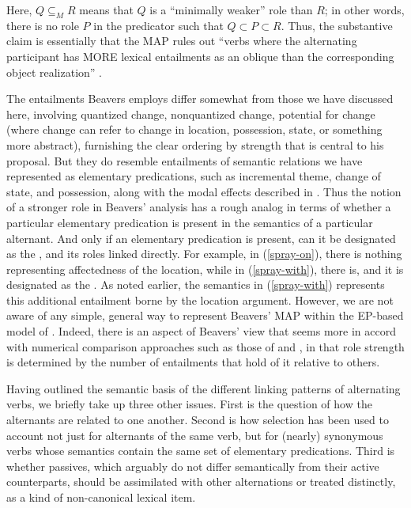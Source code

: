 \documentclass[output=paper]{langsci/langscibook}
\begin{document}
\noindent
Here, $Q\subseteq_{M}R$ means that $Q$ is a ``minimally weaker'' role than $R$; in other words, there is no role $P$ in the predicator such that $Q⊂P⊂R$.
Thus, the substantive claim is essentially that the MAP rules out ``verbs where the alternating participant has \textsc{MORE} lexical entailments as an oblique than the corresponding object realization'' \citep[849]{Beavers2010}.

The entailments Beavers employs differ somewhat from those we have discussed here, involving quantized change, nonquantized change, potential for change (where change can refer to change in location, possession, state, or something more abstract), furnishing the clear ordering by strength that is central to his proposal.
But they do resemble entailments of semantic relations we have represented as elementary predications, such as incremental theme, change of state, and possession, along with the modal effects described in \citet{KoenigandDavis2001}.
Thus the notion of a stronger role in Beavers' analysis has a rough analog in terms of whether a particular elementary predication is present in the semantics of a particular alternant.
And only if an elementary predication is present, can it be designated as the , and its roles linked directly.
For example, in (\ref{spray-on}), there is nothing representing affectedness of the location, while in (\ref{spray-with}), there is, and it is designated as the .
As noted earlier, the semantics in (\ref{spray-with}) represents this additional entailment borne by the location argument.
However, we are not aware of any simple, general way to represent Beavers' MAP within the EP-based model of \citet{KoenigandDavis2006}.
Indeed, there is an aspect of Beavers' view that seems more in accord with numerical comparison approaches such as those of \citet{Dowty91a} and \citet{AckermanandMoore2001}, in that role strength is determined by the number of entailments that hold of it relative to others.

Having outlined the semantic basis of the different linking patterns of alternating verbs, we briefly take up three other issues.
First is the question of how the alternants are related to one another.
Second is how  selection has been used to account not just for alternants of the same verb, but for (nearly) synonymous verbs whose semantics contain the same set of elementary predications.
Third is whether passives, which arguably do not differ semantically from their active counterparts, should be assimilated with other alternations or treated distinctly, as a kind of non-canonical lexical item.
\end{document}
